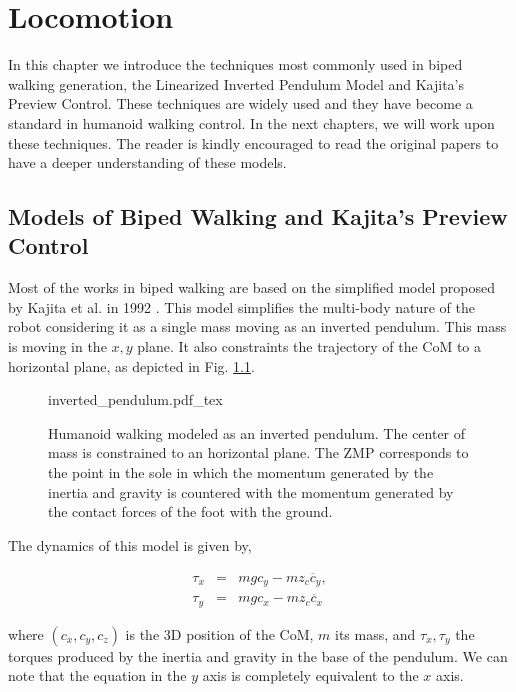 
\chapter{Locomotion} 
\label{Chap:Locomotion-Control}

In this chapter we introduce the techniques most commonly used in biped walking generation, the Linearized Inverted Pendulum Model and Kajita's Preview Control. These techniques are widely used and they have become a standard in humanoid walking control. In the next chapters, we will work upon these techniques. The reader is kindly encouraged to read the original papers to have a deeper understanding of these models.


\section{Models of Biped Walking and Kajita's Preview Control}
Most of the works in biped walking are based on the simplified model proposed by Kajita et al. in 1992 \citep{Kajita1992}. This model simplifies the multi-body nature of the robot considering it as a single mass moving as an inverted pendulum. This mass is moving in the $x,y$ plane. It also constraints the trajectory of the CoM to a horizontal plane, as depicted in Fig. \ref{Fig:Inverted-Pendulum}.

\begin{figure}
  \centering
      {\def\svgwidth{1.0\columnwidth}
        
                   {inverted_pendulum.pdf_tex}}
      \caption[]{Humanoid walking modeled as an inverted pendulum. The center of mass is constrained to an horizontal plane. The ZMP corresponds to the point in the sole in which the momentum generated by the inertia and gravity is countered with the momentum generated by the contact forces of the foot with the ground.}
      \label{Fig:Inverted-Pendulum}
\end{figure}

The dynamics of this model is given by,

\begin{eqnarray}
\label{Eq:LIPM_dynamics}
\tau_x &=& mgc_y - mz_c \ddot{c_y}, \\
\tau_y &=& mgc_x - mz_c \ddot{c_x}
\end{eqnarray}

where $(c_x, c_y, c_z)$ is the 3D position of the CoM, $m$ its mass, and $\tau_x, \tau_y$ the torques produced by the inertia and gravity in the base of the pendulum. We can note that the equation in the $y$ axis is completely equivalent to the $x$ axis.

